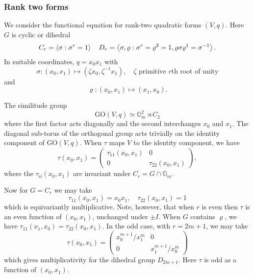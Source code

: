 \documentclass[12pt]{amsart}
\numberwithin{equation}{section}
\newcommand{\bG}{\mathbb{G}}
\newcommand{\GO}{\mathrm{GO}}
\theoremstyle{plain}
\theoremstyle{definition}
\theoremstyle{remark}
\begin{document}
\subsubsection*{Rank two forms}
We consider the functional equation for rank-two quadratic forms $(V,q)$. Here $G$ is cyclic or dihedral
$$C_r=\left<\sigma:\sigma^r=1\right>\quad
D_r=\left<\sigma,\varrho:\sigma^r=\varrho^2=1, \varrho\sigma\varrho^{\-1}=\sigma^{-1}\right>.$$ 
In suitable coordinates, $q=x_0x_1$ with
$$\sigma:(x_0,x_1) \mapsto (\zeta x_0, \zeta^{-1}x_1), \quad
\zeta \text{ primitive $r$th root of unity}
$$
and
$$\varrho: (x_0,x_1) \mapsto (x_1,x_0).$$

The similitude group 
$$\GO(V,q) \simeq \bG_m^2 \rtimes C_2$$
where the first factor acts diagonally and the second interchanges $x_0$ and $x_1$.
The diagonal sub-torus of the orthogonal group acts trivially on the identity component of $\GO(V,q)$. When $\tau$ maps $V$ to 
the identity component, we have
\begin{equation} \label{eqn:Crtau}
\tau(x_0,x_1) = \left(\begin{matrix} \tau_{11}(x_0,x_1) & 0 \\
                                       0 & \tau_{22}(x_0,x_1)
                                       \end{matrix} \right),
\end{equation}
where the $\tau_{ii}(x_0,x_1)$ are invariant under
$C_r=G\cap \bG_m$. 

Now for $G=C_r$ we may take 
$$\tau_{11}(x_0,x_1)=x_0x_1, \quad \tau_{22}(x_0,x_1)=1$$
which is equivariantly multiplicative.
Note, however, that when $r$ is even then $\tau$
is an even function of $(x_0,x_1)$, unchanged
under $\pm I$.  
When $G$ contains $\varrho$, we have
$\tau_{11}(x_1,x_0)=\tau_{22}(x_0,x_1)$.
In the odd case, with $r=2m+1$, we may take 
$$\tau(x_0,x_1) = \left( \begin{matrix} x_0^{m+1}/x_1^m & 0 \\
                                        0 & x_1^{m+1}/x_0^m
                                \end{matrix} \right)$$
which gives multiplicativity for the dihedral group $D_{2m+1}$. Here $\tau$ is odd as a function
of $(x_0,x_1)$.
\end{document}
